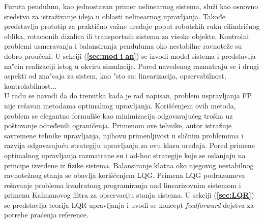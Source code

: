\documentclass[a4paper,11pt]{article}
\theoremstyle{definition} \newtheorem{deff}{Definicija}[section]
\theoremstyle{definition} \newtheorem{prim}[deff]{Primer}
\theoremstyle{plain} \newtheorem{teor}[deff]{Teorema}
\begin{document}
	
	
	Furuta pendulum, kao jednostavan primer nelinearnog sistema, služi kao osnovno sredstvo za istraživanje ideja u oblasti nelinearnog upravljanja. Takođe predstavlja prototip za praktično važne uređaje poput robotskih ruku cilindričnog oblika, rotacionih dizalica ili transportnih sistema za visoke objekte. Kontrolni problemi usmeravanja i balansiranja penduluma oko nestabilne ravnoteže su dobro proučeni. U sekciji (\textbf{\ref{sec:mod i an}}) se izvodi model sistema i predstavlja na"cin realizaciji istog u okviru simulacije. Pored navedenog razmatraju se i drugi aspekti od zna"caja za sistem, kao "sto su: linearizacija, opservabilnost, kontrolabilnost...\\
	
	U radu \cite{inicijalna} se navodi da do trenutka kada je rad napisan, problem uspravljanja FP nije rešavan metodama optimalnog upravljanja. Korišćenjem ovih metoda, problem se elegantno formuliše kao minimizacija odgovarajućeg troška uz poštovanje određenih ograničenja. Primenom ove tehnike, autor istražuje savremene tehnike upravljanja, njihovu primenljivost u sličnim problemima i razvija odgovarajuću strategiju upravljanja za ovu klasu uređaja. Pored primene optimalnog upravljanja razmatrane su i ad-hoc strategije koje se oslanjaju na principe izvedene iz fizike sistema. Balansiranje klatna oko njegovog nestabilnog ravnotežnog stanja se obavlja korišćenjem LQG. Primena LQG podrazumeva rešavanje problema kvadratnog programiranja nad linearizovnim sistemom i primenu Kalmanovog filtra za opservaciju stanja sistema. U sekciji (\textbf{\ref{sec:LQR}}) se predstavlja teorija LQR upravljanja i uvodi se koncept \emph{feedforward} dejstva za potrebe pra\'cenja reference.\\
	
\end{document}
